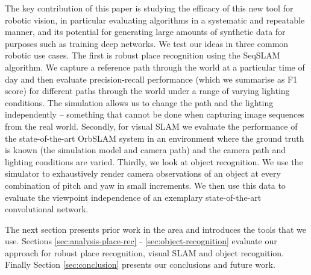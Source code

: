 The key contribution of this paper is studying the efficacy of this new tool for robotic vision, in particular evaluating algorithms in a systematic and repeatable manner, and its potential for generating large amounts of synthetic data for purposes such as training deep networks.
We test our ideas in three common robotic use cases.
The first is robust place recognition using the SeqSLAM\cite{Milford2012} algorithm.  We capture a reference path through the world at a particular time of day and then evaluate precision-recall performance (which we summarise as F1 score) for different paths through the world under a range of varying lighting conditions.  The simulation allows us to change the path and the lighting independently -- something that cannot be done when capturing image sequences from the real world.
Secondly, for visual SLAM we evaluate the performance of the state-of-the-art OrbSLAM system in an environment where the ground truth is known (the simulation model and camera path) and the camera path and lighting conditions are varied.
Thirdly, we look at object recognition.  We use the simulator to exhaustively render camera observations of an object at every combination of pitch and yaw in small increments. We then use this data to evaluate the viewpoint independence of an exemplary state-of-the-art convolutional network.

The next section presents prior work in the area and introduces the tools that we use.  Sections \ref{sec:analysis-place-rec} - \ref{sec:object-recognition} evaluate our approach for robust place recognition,
visual SLAM and object recognition.  Finally Section \ref{sec:conclusion} presents our conclusions and future work. 

